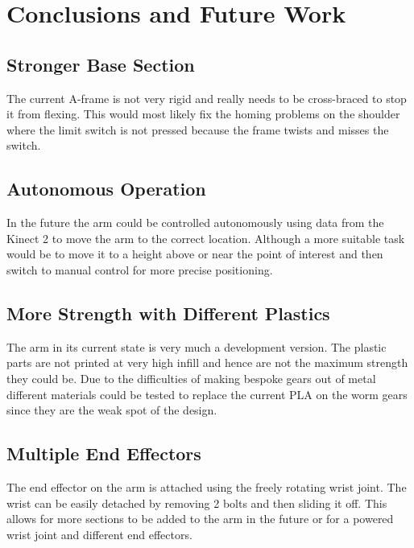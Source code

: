 \section{Conclusions and Future Work}

\subsection{Stronger Base Section}
The current A-frame is not very rigid and really needs to be cross-braced to stop it from flexing. This would most likely fix the homing problems on the shoulder where the limit switch is not pressed because the frame twists and misses the switch.

\subsection{Autonomous Operation}
In the future the arm could be controlled autonomously using data from the Kinect 2 to move the arm to the correct location. Although a more suitable task would be to move it to a height above or near the point of interest and then switch to manual control for more precise positioning.

\subsection{More Strength with Different Plastics}
The arm in its current state is very much a development version. The plastic parts are not printed at very high infill and hence are not the maximum strength they could be. Due to the difficulties of making bespoke gears out of metal different materials could be tested to replace the current PLA on the worm gears since they are the weak spot of the design.

\subsection{Multiple End Effectors}
The end effector on the arm is attached using the freely rotating wrist joint. The wrist can be easily detached by removing 2 bolts and then sliding it off. This allows for more sections to be added to the arm in the future or for a powered wrist joint and different end effectors.
  